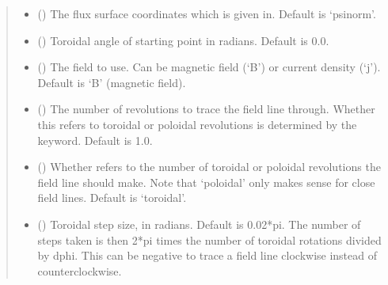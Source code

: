 \documentclass[letterpaper,10pt,english]{sphinxmanual}
\begin{document}
\begin{fulllineitems}
\begin{fulllineitems}
\begin{quote}
\begin{description}
\begin{itemize}
\item {} 
 (\sphinxstyleliteralemphasis{\sphinxupquote{, }}\sphinxstyleliteralemphasis{\sphinxupquote{, }}\sphinxstyleliteralemphasis{\sphinxupquote{, }}\sphinxstyleliteralemphasis{\sphinxupquote{, }}\sphinxstyleliteralemphasis{\sphinxupquote{, }}) \textendash{} The flux surface coordinates which  is given in.
Default is ‘psinorm’.

\item {} 
 () \textendash{} Toroidal angle of starting point in radians. Default
is 0.0.

\item {} 
 (\sphinxstyleliteralemphasis{\sphinxupquote{, }}) \textendash{} The field to use. Can be magnetic field (‘B’) or
current density (‘j’). Default is ‘B’ (magnetic field).

\item {} 
 () \textendash{} The number of revolutions to trace the field line
through. Whether this refers to toroidal or poloidal revolutions
is determined by the  keyword. Default is 1.0.

\item {} 
 (\sphinxstyleliteralemphasis{\sphinxupquote{, }}) \textendash{} Whether  refers to the
number of toroidal or poloidal revolutions the field line should
make. Note that ‘poloidal’ only makes sense for close field
lines. Default is ‘toroidal’.

\item {} 
 () \textendash{} Toroidal step size, in radians. Default is 0.02*pi.
The number of steps taken is then 2*pi times the number of
toroidal rotations divided by dphi. This can be negative to
trace a field line clockwise instead of counterclockwise.


\end{itemize}
\end{description}
\end{quote}
\end{fulllineitems}
\end{fulllineitems}
\end{document}
